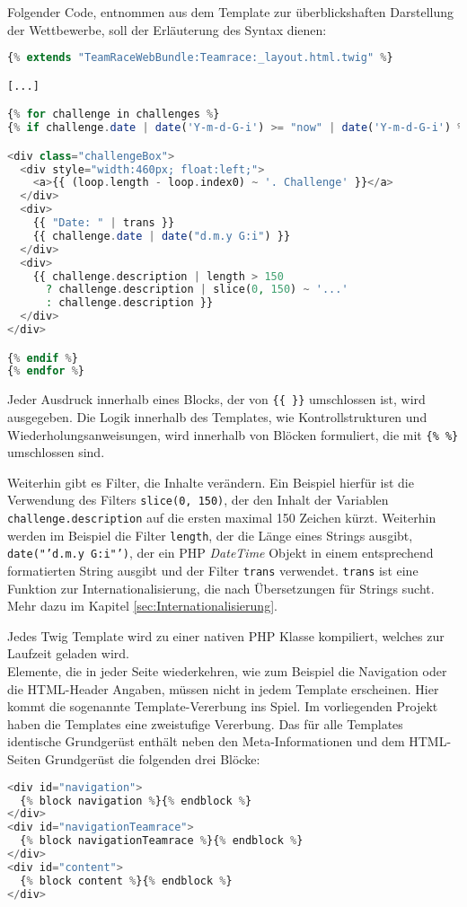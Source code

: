 \documentclass[12pt]{report}
\begin{document}
Folgender Code, entnommen aus dem Template zur überblickshaften Darstellung der Wettbewerbe, soll der Erläuterung des Syntax dienen:
\begin{lstlisting}[language=PHP, caption=Auszug aus\\ src/TeamRace/WebBundle/Resources/views/Teamrace/challenges.html.twig, label=lst:challenges]
{% extends "TeamRaceWebBundle:Teamrace:_layout.html.twig" %}

[...]

{% for challenge in challenges %}
{% if challenge.date | date('Y-m-d-G-i') >= "now" | date('Y-m-d-G-i') %}

<div class="challengeBox">
  <div style="width:460px; float:left;">
    <a>{{ (loop.length - loop.index0) ~ '. Challenge' }}</a>
  </div>
  <div>
    {{ "Date: " | trans }}
    {{ challenge.date | date("d.m.y G:i") }}
  </div>
  <div>
    {{ challenge.description | length > 150 
      ? challenge.description | slice(0, 150) ~ '...' 
      : challenge.description }}
  </div>
</div>

{% endif %}
{% endfor %}

\end{lstlisting}


Jeder Ausdruck innerhalb eines Blocks, der von \texttt{\{\{ \}\}} umschlossen ist, wird ausgegeben. Die Logik innerhalb des Templates, wie Kontrollstrukturen und Wiederholungsanweisungen, wird innerhalb von Blöcken formuliert, die mit \texttt{\{\% \%\}} umschlossen sind.

Weiterhin gibt es Filter, die Inhalte verändern. Ein Beispiel hierfür ist die Verwendung des Filters \texttt{slice(0, 150)}, der den Inhalt der Variablen \texttt{challenge.description} auf die ersten maximal 150 Zeichen kürzt. Weiterhin werden im Beispiel die Filter \texttt{length}, der die Länge eines Strings ausgibt, \texttt{date("'d.m.y G:i"')}, der ein PHP \emph{DateTime} Objekt in einem entsprechend formatierten String ausgibt und der Filter \texttt{trans} verwendet. \texttt{trans} ist eine Funktion zur Internationalisierung, die nach Übersetzungen für Strings sucht. Mehr dazu im Kapitel \ref{sec:Internationalisierung}.

Jedes Twig Template wird zu einer nativen PHP Klasse kompiliert, welches zur Laufzeit geladen wird.\\

Elemente, die in jeder Seite wiederkehren, wie zum Beispiel die Navigation oder die HTML-Header Angaben, müssen nicht in jedem Template erscheinen. Hier kommt die sogenannte Template-Vererbung ins Spiel. Im vorliegenden Projekt haben die Templates eine zweistufige Vererbung. Das für alle Templates identische Grundgerüst enthält neben den Meta-Informationen und dem HTML-Seiten Grundgerüst die folgenden drei Blöcke:
\begin{lstlisting}[language=PHP, caption=Auszug aus app/Resources/views/TeamRace.html.twig]
<div id="navigation">
  {% block navigation %}{% endblock %}
</div>
<div id="navigationTeamrace">
  {% block navigationTeamrace %}{% endblock %}
</div>
<div id="content">
  {% block content %}{% endblock %}
</div>
\end{lstlisting}
\end{document}
